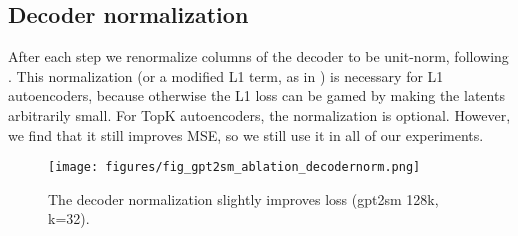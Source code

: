 \subsection{Decoder normalization}

After each step we renormalize columns of the decoder to be unit-norm, following \citet{bricken2023monosemanticity}. This normalization (or a modified L1 term, as in \citet{conerly2024update}) is necessary for L1 autoencoders, because otherwise the L1 loss can be gamed by making the latents arbitrarily small. For TopK autoencoders, the normalization is optional. However, we find that it still improves MSE, so we still use it in all of our experiments.

\begin{figure}[h]
    \centering
    \texttt{[image: figures/fig\_gpt2sm\_ablation\_decodernorm.png]}
    \caption{The decoder normalization slightly improves loss (gpt2sm 128k, k=32).}
    \label{fig:enter-label2}
\end{figure}



